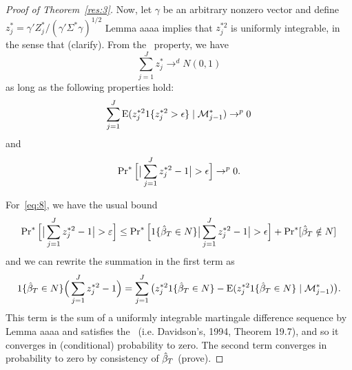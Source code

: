 \documentclass[12pt,fleqn]{article}
\begin{document}
\begin{proof}[Proof of Theorem~\ref{res:3}]
  Now, let $\gamma$ be an arbitrary nonzero vector and define $z_j^* =
  \gamma'Z_j^* / (\gamma'\Sigma^*\gamma)^{1/2}$ Lemma aaaa implies
  that $z_j^{*2}$ is uniformly integrable, in the sense that
  (clarify). From the \mds\ property, we have
  \begin{equation*}
    \sum_{j=1}^J z_j^* \to^d N(0, 1)
  \end{equation*}
  as long as the following properties hold:
  \begin{equation}\label{eq:7}
    \sum_{j=1}^J \operatorname{E}(z_j^{*2} 1\{z_j^{*2} > \epsilon\} \mid \mathcal{M}_{j-1}^*) \to^p 0
  \end{equation}
  and
  \begin{equation}\label{eq:8}
    \operatorname{Pr}^*\Big[ \big| \sum_{j=1}^J z_j^{*2} - 1 \big| > \epsilon\Big] \to^p 0.
  \end{equation}

  For~\eqref{eq:8}, we have the usual bound
  \begin{equation*}
    \pr^*\Big[ \big|\sum_{j=1}^J z_j^{*2} - 1 \big| > \varepsilon\Big] \leq
    \pr^*\Big[ 1\{\btrue[*] \in N\} \big| \sum_{j=1}^J z_j^{*2} - 1 \big| > \epsilon \Big]
     + \pr^*[ \btrue[*] \notin N ]
  \end{equation*}
  and we can rewrite the summation in the first term as
  \begin{equation*}
    1\{\btrue[*] \in N\} \Big( \sum_{j=1}^J z_j^{*2} - 1 \Big)
    =  \sum_{j=1}^J \big(z_j^{*2}1\{\btrue[*] \in N\} - \E(z_j^{*2} 1\{\btrue[*] \in N\} \mid \Ms_{j-1}^*) \big).
   \end{equation*}
   This term is the sum of a uniformly integrable martingale
   difference sequence by Lemma aaaa and satisfies the \lln\
   (i.e. Davidson's, 1994, Theorem 19.7), and so it converges in
   (conditional) probability to zero.
   The second term converges in probability to zero by consistency of $\btrue[*]$ (prove).


\end{proof}
\end{document}
